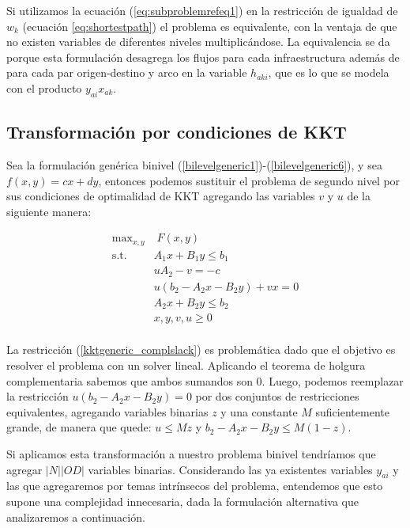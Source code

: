 \documentclass{article}
\begin{document}
  Si utilizamos la ecuación (\ref{eq:subproblemrefeq1}) en la restricción de igualdad de $w_k$ (ecuación \ref{eq:shortestpath}) el problema es equivalente, con la ventaja de que no existen variables de diferentes niveles multiplicándose. La equivalencia se da porque esta formulación desagrega los flujos para cada infraestructura además de para cada par origen-destino y arco en la variable $h_{aki}$, que es lo que se modela con el producto $y_{ai} x_{ak}$.

  \subsection{Transformación por condiciones de KKT}

  Sea la formulación genérica binivel (\ref{bilevelgeneric1})-(\ref{bilevelgeneric6}), y sea $f(x, y) = cx + dy$, entonces podemos sustituir el problema de segundo nivel por sus condiciones de optimalidad de KKT agregando las variables $v$ y $u$ de la siguiente manera:

  \begin{align}
    \text{max}_{x,y}        & \; F(x, y) \label{kktgeneric1} \\
    \text{s.t.}             & A_1 x + B_1 y \leq b_1 \\
                            & uA_2 - v = -c \\
                            & u(b_2 - A_2x - B_2y) + vx = 0 \label{kktgeneric_complslack} \\
                            & A_2 x + B_2 y \leq b_2 \label{kktgeneric5} \\
                            & x, y, v, u \geq 0 \label{kktgeneric6} \\
  \end{align}

  La restricción (\ref{kktgeneric_complslack}) es problemática dado que el objetivo es resolver el problema con un solver lineal. Aplicando el teorema de holgura complementaria sabemos que ambos sumandos son 0. Luego, podemos reemplazar la restricción $u(b_2 - A_2x - B_2y) = 0$ por dos conjuntos de restricciones equivalentes, agregando variables binarias $z$ y una constante $M$ suficientemente grande, de manera que quede: $u \leq Mz$ y $b_2 - A_2x - B_2y \leq M(1-z)$.

  Si aplicamos esta transformación a nuestro problema binivel tendríamos que agregar $|N| |OD|$ variables binarias. Considerando las ya existentes variables $y_{ai}$ y las que agregaremos por temas intrínsecos del problema, entendemos que esto supone una complejidad innecesaria, dada la formulación alternativa que analizaremos a continuación.
\end{document}

